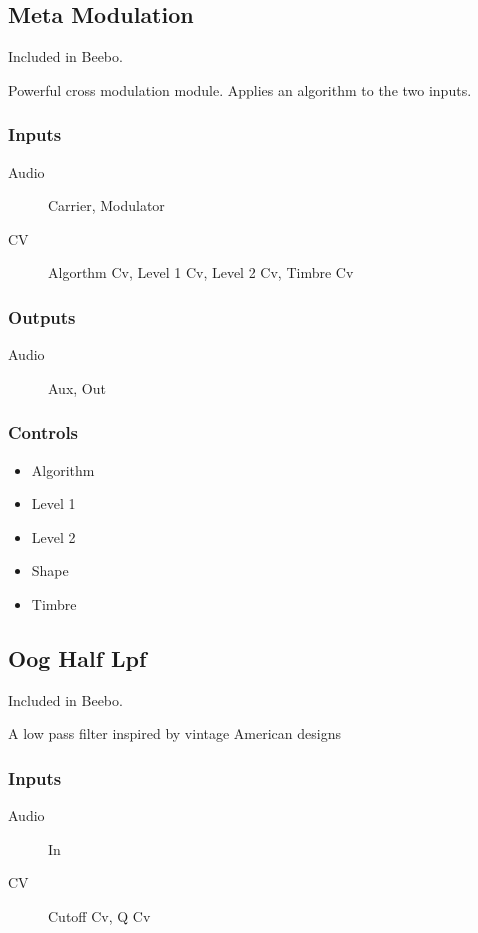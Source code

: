 \subsection{Meta Modulation}

Included in Beebo.

Powerful cross modulation module. Applies an algorithm to the two inputs.



\subsubsection{Inputs}
\begin{description}
\item [Audio] Carrier, Modulator
\item [CV] Algorthm Cv, Level 1 Cv, Level 2 Cv, Timbre Cv
\end{description}

\subsubsection{Outputs}
\begin{description}
\item [Audio] Aux, Out
\end{description}

\subsubsection{Controls}
\begin{itemize}
\item Algorithm
\item Level 1
\item Level 2
\item Shape
\item Timbre
\end{itemize}

\subsection{Oog Half Lpf}

Included in Beebo.

A low pass filter inspired by vintage American designs



\subsubsection{Inputs}
\begin{description}
\item [Audio] In
\item [CV] Cutoff Cv, Q Cv
\end{description}


